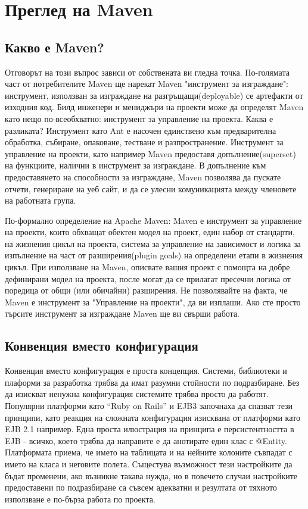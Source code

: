 \section{Преглед на Maven}
\subsection{Какво е Maven?} 
Отговорът на този въпрос зависи от собствената ви гледна
точка. По-голямата част от потребителите Maven ще нарекат Maven
"инструмент за изграждане": инструмент, използван за изграждане на
разгръщащи(deployable) се артефакти от изходния код. Билд инженери и
мениджъри на проекти може да определят Maven като нещо по-всеобхватно:
инструмент за управление на проекта. Каква е разликата? Инструмент
като Ant е насочен единствено към предварителна обработка, събиране,
опаковане, тестване и разпространение. Инструмент за управление на
проекти, като например Maven предоставя допълнение(superset) на
функциите, налични в инструмент за изграждане. В допълнение към
предоставянето на способности за изграждане, Maven позволява да
пускате отчети, генериране на уеб сайт, и да се улесни комуникацията
между членовете на работната група.

По-формално определение на Apache Maven: Maven е инструмент за
управление на проекти, които обхващат обектен модел на проект, един
набор от стандарти, на жизнения цикъл на проекта, система за
управление на зависимост и логика за изпълнение на част от
разширения(plugin goals) на определени етапи в жизнения цикъл. При
използване на Maven, описвате вашия проект с помощта на добре
дефинирани модел на проекта, после могат да се прилагат пресечни
логика от поредица от общи (или обичайни) разширения.  Не позволявайте на
факта, че Maven е инструмент за "Управление на проекти", да ви
изплаши. Ако сте просто търсите инструмент за изграждане Maven ще
ви свърши работа. 
\subsection{Конвенция вместо конфигурация}
Конвенция вместо конфигурация е проста концепция. Системи, библиотеки
и плаформи за разработка  
трябва да имат разумни стойности по подразбиране. Без да изискват
ненужна конфигурация системите трябва просто да работят. Популярни
платформи като "`Ruby on Rails"' и EJB3 започнаха да спазват тези
принципи, като реакция на сложната конфигурация изисквана от платформи
като EJB 2.1 например. Една проста илюстрация на принципа е
персистентността в EJB - всичко, което трябва да направите е да
анотирате един клас с @Entity. Платформата приема, че името на
таблицата и на нейните колоните съвпадат с името на класа и неговите
полета. Същестува възможност тези настройките да бъдат променени, ако
възникне такава нужда, но в повечето случаи настройките предоставени
по подразбиране са съвсем адекватни и резултата от тяхното използване
е по-бърза работа по проекта.

